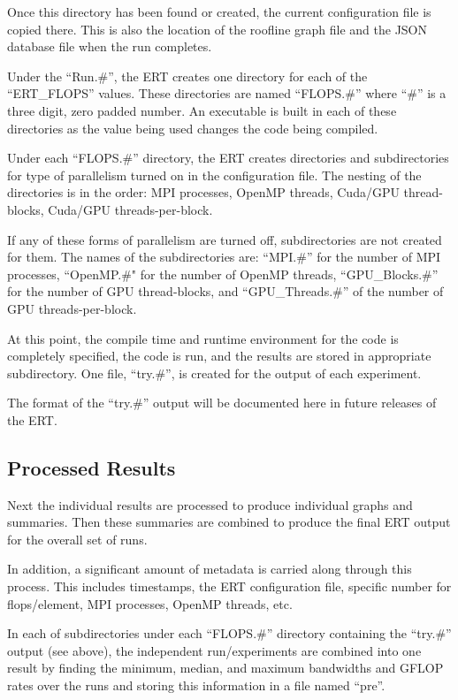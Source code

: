 Once this directory has been found or created, the current configuration file
is copied there.  This is also the location of the roofline graph file
and the JSON database file when the run completes.

Under the ``Run.\#'', the ERT creates one directory for each of the
``ERT\_\+FLOPS'' values.  These directories are named ``FLOPS.\#'' where
``\#'' is a three digit, zero padded number.  An executable is built in
each of these directories as the value being used changes the code being
compiled.

Under each ``FLOPS.\#'' directory, the ERT creates directories and
subdirectories for type of parallelism turned on in the configuration file.
The nesting of the directories is in the order:  MPI processes, OpenMP
threads, Cuda/GPU thread-blocks, Cuda/GPU threads-per-block.

If any of these forms of parallelism are turned off, subdirectories are not
created for them.  The names of the subdirectories are:  ``MPI.\#'' for the
number of MPI processes, ``OpenMP.\#" for the number of OpenMP threads,
``GPU\_\+Blocks.\#'' for the number of GPU thread-blocks, and
``GPU\_\+Threads.\#'' of the number of GPU threads-per-block.

At this point, the compile time and runtime environment for the code is
completely specified, the code is run, and the results are stored in
appropriate subdirectory.  One file, ``try.\#'', is created for the output
of each experiment.

The format of the ``try.\#'' output will be documented here in future releases
of the ERT.

\subsection{Processed Results}

Next the individual results are
processed to produce individual graphs and summaries.  Then these summaries
are combined to produce the final ERT output for the overall set of runs.

In addition, a significant amount of metadata is carried along through this
process.  This includes timestamps, the ERT configuration file, specific
number for flops/element, MPI processes, OpenMP threads, etc.

In each of subdirectories under each ``FLOPS.\#'' directory containing the
``try.\#'' output (see above), the independent run/experiments are combined
into one result by finding the minimum, median, and maximum bandwidths and
GFLOP rates over the runs and storing this information in a file named
``pre''.

